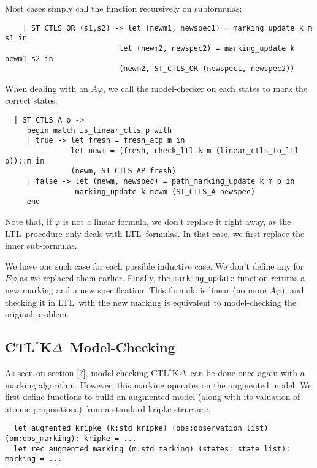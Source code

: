 \documentclass[dvipsnames]{acmart}
\def\ctlskd{CTL$^{*}$K$\Delta$}
\def\ltl{LTL}
\def\A{\mathit{A}}
\def\E{\mathit{E}}
\begin{document}
Most cases simply call the function recursively on subformulas:
\begin{lstlisting}
    | ST_CTLS_OR (s1,s2) -> let (newm1, newspec1) = marking_update k m s1 in
                          let (newm2, newspec2) = marking_update k newm1 s2 in
                          (newm2, ST_CTLS_OR (newspec1, newspec2))
\end{lstlisting}

When dealing with an $\A\varphi$, we call the model-checker on each states to mark the correct states:
\begin{lstlisting}
  | ST_CTLS_A p ->
     begin match is_linear_ctls p with
     | true -> let fresh = fresh_atp m in
               let newm = (fresh, check_ltl k m (linear_ctls_to_ltl p))::m in
               (newm, ST_CTLS_AP fresh)
     | false -> let (newm, newspec) = path_marking_update k m p in
                marking_update k newm (ST_CTLS_A newspec)
     end
\end{lstlisting}
Note that, if $\varphi$ is not a linear formula, we don't replace it right away, as the \ltl\ procedure only deals with \ltl\ formulas. In that case, we first replace the inner sub-formulas.

We have one such case for each possible inductive case. We don't define any for $\E\varphi$ as we replaced them earlier.
Finally, the \lstinline{marking_update} function returns a new marking and a new specification. This formula is linear (no more $\A\varphi$), and checking it in \ltl\ with the new marking is equivalent to model-checking the original problem.

\subsection{\ctlskd\ Model-Checking}
As seen on section [?], model-checking \ctlskd\ can be done once again with a marking algorithm.
However, this marking operates on the augmented model.
We first define functions to build an augmented model (along with its valuation of atomic propositions) from a standard kripke structure.

\begin{lstlisting}
  let augmented_kripke (k:std_kripke) (obs:observation list) (om:obs_marking): kripke = ...
  let rec augmented_marking (m:std_marking) (states: state list): marking = ...
\end{lstlisting}
\end{document}
